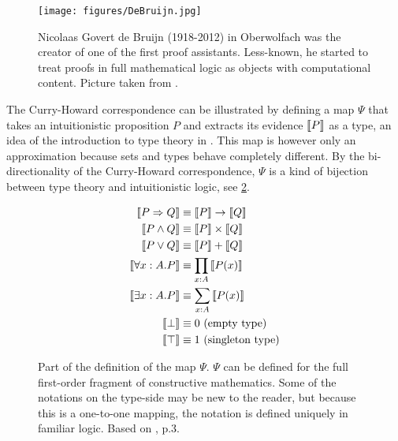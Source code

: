 \documentclass[11pt,a4paper,twoside,xetex,draft]{book}
\begin{document}
\begin{figure}
\begin{centering}
\texttt{[image: figures/DeBruijn.jpg]}
\par\end{centering}
\caption{\label{fig:Nicolaas-Govert-de}Nicolaas Govert de Bruijn (1918-2012)
in Oberwolfach was the creator of one of the first proof assistants. Less-known, he started to treat proofs in full mathematical logic as objects with computational content. Picture taken from \cite{Konrad2017}.}
\end{figure}

The Curry-Howard correspondence can be illustrated by defining a map $\Psi$ that takes an intuitionistic proposition $P$ and extracts its evidence $\left\llbracket P\right\rrbracket$ as a type, an idea of the introduction to type theory in \cite{Altenkirch2017}. This map is however only an approximation because sets and types behave completely different. By the bi-directionality of the Curry-Howard correspondence, $\Psi$ is a kind of bijection between type theory and intuitionistic logic, see \cref{currypsi}. 


\begin{figure}\label{currypsi}
\centering

\begin{align*}
\left\llbracket P\Rightarrow Q\right\rrbracket &\equiv  \left\llbracket P\right\rrbracket \rightarrow \left\llbracket Q\right\rrbracket\\
\left\llbracket P\wedge Q\right\rrbracket     &\equiv  \left\llbracket P\right\rrbracket \times \left\llbracket Q\right\rrbracket\\
\left\llbracket P\vee Q\right\rrbracket       & \equiv  \left\llbracket P\right\rrbracket + \left\llbracket Q\right\rrbracket\\
\left\llbracket \forall x:A.P\right\rrbracket & \equiv  \prod_{x:A}\left\llbracket P(x)\right\rrbracket\\
\left\llbracket \exists x:A.P\right\rrbracket & \equiv \sum_{x:A}\left\llbracket P(x)\right\rrbracket \\
\left\llbracket \bot\right\rrbracket          & \equiv 0 \ \text{(empty type)} \\
\left\llbracket \top\right\rrbracket 		 & \equiv  1 \ \text{(singleton type)}
\end{align*}
\caption{Part of the definition of the map $\Psi$. $\Psi$ can be  defined for the full first-order fragment of constructive mathematics. Some of the notations on the type-side may be new to the reader, but because this is a one-to-one mapping, the notation is defined uniquely in familiar logic. Based on \cite{Altenkirch2017}, p.3. }
\end{figure}
\end{document}
